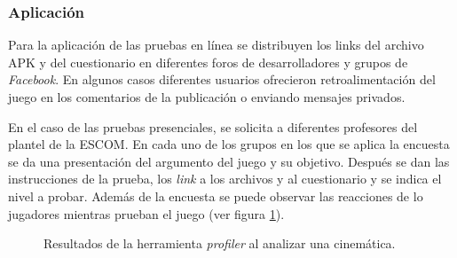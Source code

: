 \subsubsection{Aplicación}
Para la aplicación de las pruebas en línea se distribuyen los links del archivo APK y del cuestionario en diferentes foros de desarrolladores y grupos de \textit{Facebook}. En algunos casos diferentes usuarios ofrecieron retroalimentación del juego en los comentarios de la publicación o enviando mensajes privados.
\\
\par
En el caso de las pruebas presenciales, se solicita a diferentes profesores del
plantel de la ESCOM. En cada uno de los grupos en los que se aplica la encuesta
se da una presentación del argumento del juego y su objetivo. Después se dan las
instrucciones de la prueba, los \textit{link} a los archivos y al cuestionario y
se indica el nivel a probar. Además de la encuesta se puede observar las
reacciones de lo jugadores mientras prueban el juego
(ver figura \ref{fig:AlumnosESCOM}).

\begin{figure}
  \centering
 
        
  \caption{Resultados de la herramienta \textit{profiler} al analizar una cinemática.}
  \label{fig:AlumnosESCOM}
\end{figure}

